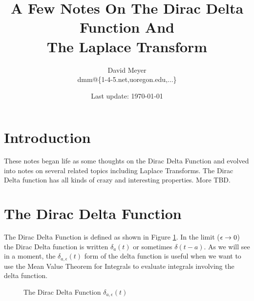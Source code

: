 \documentclass{article}
\title{A Few Notes On The Dirac Delta Function And \\ The Laplace Transform}
\author{David Meyer \\ dmm@\{1-4-5.net,uoregon.edu,...\}}
\date{Last update: \today}							%
\theoremstyle{definition}
\begin{document}
\maketitle

\section{Introduction}
These notes began life as some thoughts on the Dirac Delta Function and evolved into notes on several related topics including  Laplace Transforms. The 
Dirac Delta function has all kinds of crazy and interesting properties. More TBD.

\section{The Dirac Delta Function}
The Dirac Delta Function is defined as shown in Figure \ref{fig:delta}. In the limit ($\mathlarger{\epsilon} \to 0$) the
 Dirac Delta function is written $\delta_a(t)$ or sometimes $\delta(t - a)$. As we will see in a moment, the $\delta_{a,\epsilon}(t)$ form of the delta function
 is useful when we want to use the Mean Value Theorem for Integrals \cite{wiki:meam_value_theorem_for_integrals} to evaluate integrals involving the delta function.
 
\bigskip

\begin{figure}[H]
  \centering
  \caption{The Dirac Delta Function $\delta_{a,\epsilon}(t)$}
  \label{fig:delta}
\end{figure}
\end{document}
